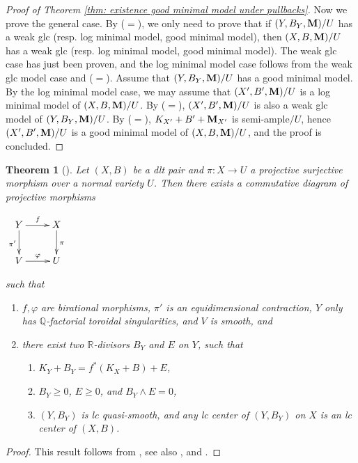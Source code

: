 \documentclass[11pt]{amsart}
\numberwithin{equation}{section}
\newcommand{\Mm}{{\bf{M}}}
\newcommand{\Qq}{\mathbb{Q}}
\newcommand{\Rr}{\mathbb{R}}
\newtheorem{thm}{Theorem}[section]
\theoremstyle{definition}
\theoremstyle{definition}
\theoremstyle{definition}
\begin{document}
\begin{proof}[Proof of Theorem \ref{thm: existence good minimal model under pullbacks}]
Now we prove the general case. By \cite[Lemma 3.10(2)]{HL21} ($=$\cite[Version 3, Lemma 3.18]{HL21}), we only need to prove that if $(Y,B_Y,\Mm)/U$ has a weak glc (resp. log minimal model, good minimal model), then $(X,B,\Mm)/U$ has a weak glc (resp. log minimal model, good minimal model). The weak glc case has just been proven, and the log minimal model case follows from the weak glc model case and \cite[Lemma 3.8]{HL21} ($=$\cite[Version 3, Lemma 3.15]{HL21}). Assume that $(Y,B_Y,\Mm)/U$ has a good minimal model. By the log minimal model case, we may assume that $(X',B',\Mm)/U$ is a log minimal model of $(X,B,\Mm)/U$. By \cite[Lemma 3.10(1)]{HL21} ($=$\cite[Version 3, Lemma 3.17]{HL21}), $(X',B',\Mm)/U$ is also a weak glc model of $(Y,B_Y,\Mm)/U$. By \cite[Lemma 3.5(2)]{HL21} ($=$\cite[Version 3, Lemma 3.9(2)]{HL21}), $K_{X'}+B'+\Mm_{X'}$ is semi-ample$/U$, hence $(X',B',\Mm)/U$ is a  good minimal model of $(X,B,\Mm)/U$, and the proof is concluded.
\end{proof}

\begin{thm}[{\cite[Version 2, Theorem 4.11]{HL21}}]\label{thm: has19 weak semistable reduction}
Let $(X,B)$ be a dlt pair and $\pi: X\rightarrow U$ a projective surjective morphism over a normal variety $U$. Then there exists a commutative diagram of projective morphisms
\begin{center}$\xymatrix{
Y\ar@{->}[r]^{f}\ar@{->}[d]_{\pi'} & X\ar@{->}[d]^{\pi}\\
V\ar@{->}[r]^{\varphi} & U
}$
\end{center}
such that
\begin{enumerate}
    \item $f,\varphi$ are birational morphisms, $\pi'$ is an equidimensional contraction, $Y$ only has $\Qq$-factorial toroidal singularities, and $V$ is smooth, and
    \item there exist two $\Rr$-divisors $B_Y$ and $E$ on $Y$, such that
    \begin{enumerate}
    \item $K_Y+B_Y=f^*(K_X+B)+E$,
    \item $B_Y\geq 0$, $E\geq 0$, and $B_Y\wedge E=0$,
    \item $(Y,B_Y)$ is lc quasi-smooth, and any lc center of $(Y,B_Y)$ on $X$ is an lc center of $(X,B)$.
    \end{enumerate}
\end{enumerate}
\end{thm}
\begin{proof} This result follows from \cite{AK00}, see also \cite[Theorem B.6]{Hu20}, \cite[Theorem 2]{Kaw15} and \cite[Step 2 of Proof of Lemma 3.2]{Has19}.
\end{proof}
\end{document}
